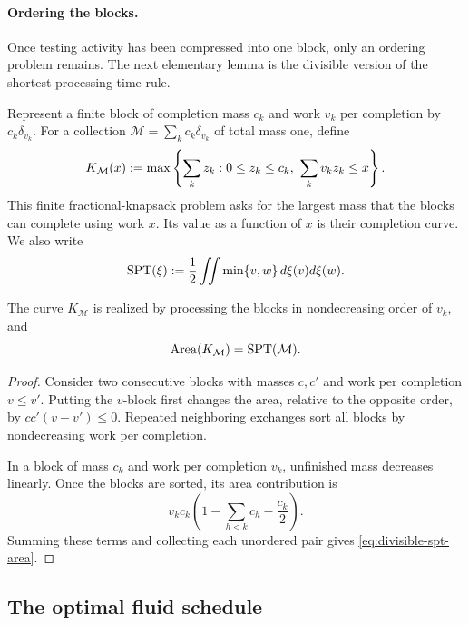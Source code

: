 \paragraph{Ordering the blocks.}

Once testing activity has been compressed into one block, only an ordering
problem remains.  The next elementary lemma is the divisible version of the
shortest-processing-time rule.

Represent a finite block of completion mass $c_k$ and work $v_k$ per
completion by $c_k\delta_{v_k}$.  For a collection
$\mathcal M=\sum_kc_k\delta_{v_k}$ of total mass one, define
\begin{equation}
 K_{\mathcal M}(x)\mathrel{:=}
 \max\left\{\sum_kz_k:
       0\le z_k\le c_k,\ \sum_kv_kz_k\le x\right\}.
 \label{eq:divisible-spt-envelope}
\end{equation}
This finite fractional-knapsack problem asks for the largest mass that the
blocks can complete using work $x$.  Its value as a function of $x$ is their
completion curve.  We also write
\begin{equation}
 \operatorname{SPT}(\xi)\mathrel{:=}
 \frac12\iint\min\{v,w\}\,d\xi(v)d\xi(w).
 \label{eq:divisible-spt-cost}
\end{equation}

\begin{lemma}
\label{lem:divisible-spt-area}
The curve $K_{\mathcal M}$ is realized by processing the blocks in
nondecreasing order of $v_k$, and
\begin{equation}
 \operatorname{Area}(K_{\mathcal M})=\operatorname{SPT}(\mathcal M).
 \label{eq:divisible-spt-area}
\end{equation}
\end{lemma}

\begin{proof}
Consider two consecutive blocks with masses $c,c'$ and work per completion
$v\le v'$.  Putting the $v$-block first changes the area, relative to the
opposite order, by $cc'(v-v')\le0$.  Repeated neighboring exchanges sort all
blocks by nondecreasing work per completion.

In a block of mass $c_k$ and work per completion $v_k$, unfinished mass
decreases linearly.  Once the blocks are sorted, its area contribution is
\[
 v_kc_k\left(1-\sum_{h<k}c_h-\frac{c_k}{2}\right).
\]
Summing these terms and collecting each unordered pair gives
\cref{eq:divisible-spt-area}.
\end{proof}

\subsection{The optimal fluid schedule}

